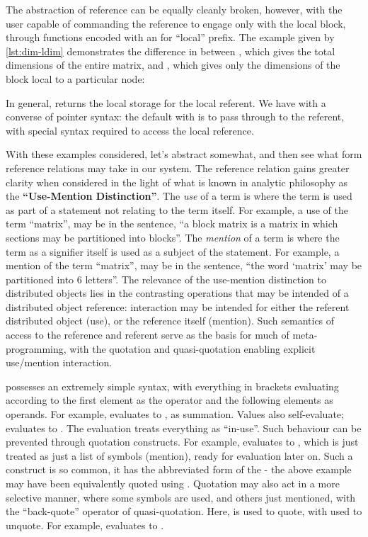 The abstraction of reference can be equally cleanly broken, however, with the user capable of commanding the reference to engage only with the local block, through functions encoded with an  for ``local'' prefix.
The example given by \cref{lst:dim-ldim} demonstrates the difference in  between , which gives the total dimensions of the entire matrix, and , which gives only the dimensions of the block local to a particular node:


In general,  returns the local storage for the  local referent.
We have with  a converse of pointer syntax: the default with  is to pass through to the referent, with special syntax required to access the local reference.

With these examples considered, let's abstract somewhat, and then see what form reference relations may take in our system.
The reference relation gains greater clarity when considered in the light of what is known in analytic philosophy as the \textbf{``Use-Mention Distinction''}\cite{quine2009}.
The \emph{use} of a term is where the term is used as part of a statement not relating to the term itself.
For example, a use of the term ``matrix'', may be in the sentence, ``a block matrix is a matrix in which sections may be partitioned into blocks''.
The \emph{mention} of a term is where the term as a signifier itself is used as a subject of the statement.
For example, a mention of the term ``matrix'', may be in the sentence, ``the word `matrix' may be partitioned into 6 letters''.
The relevance of the use-mention distinction to distributed objects lies in the contrasting operations that may be intended of a distributed object reference: interaction may be intended for either the referent distributed object (use), or the reference itself (mention).
Such semantics of access to the reference and referent serve as the basis for much of meta-programming, with the  quotation and quasi-quotation enabling explicit use/mention interaction.

 possesses an extremely simple syntax, with everything in brackets evaluating according to the first element as the operator and the following elements as operands.
For example,  evaluates to , as summation.
Values also self-evaluate;  evaluates to .
The evaluation treats everything as ``in-use''.
Such behaviour can be prevented through quotation constructs.
For example,  evaluates to , which is just treated as just a list of symbols (mention), ready for evaluation later on.
Such a construct is so common, it has the abbreviated form of the  - the above example may have been equivalently quoted using . Quotation may also act in a more selective manner, where some symbols are used, and others just mentioned, with the ``back-quote'' operator of quasi-quotation.
Here,  is used to quote, with  used to unquote.
For example,  evaluates to .

